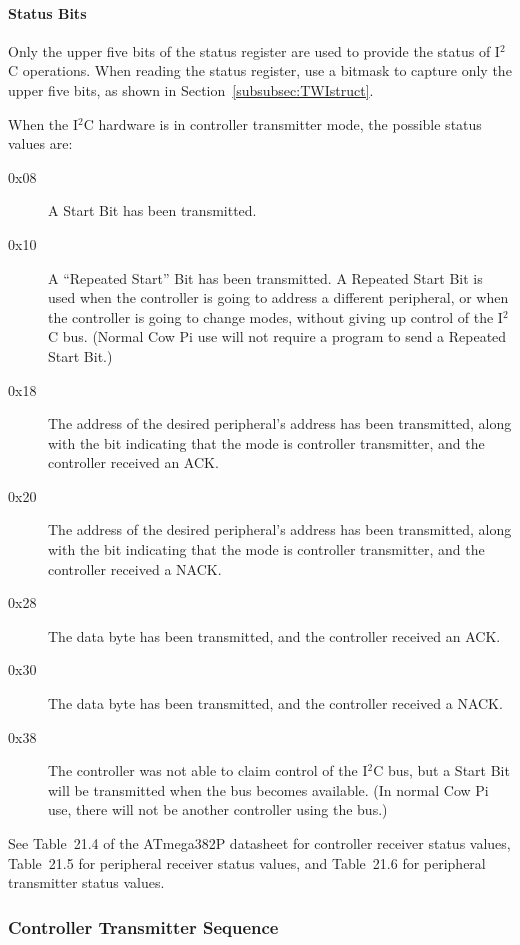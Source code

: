 \paragraph{Status Bits}

Only the upper five bits of the status register are used to provide the status of I$^2$C operations.
When reading the status register, use a bitmask to capture only the upper five bits, as shown in Section~\ref{subsubsec:TWIstruct}.

When the I$^2$C hardware is in controller transmitter mode, the possible status values are:

\begin{description}
    \item[0x08] A Start Bit has been transmitted.
    \item[0x10] A ``Repeated Start'' Bit has been transmitted.
        A Repeated Start Bit is used when the controller is going to address a different peripheral, or when the controller is going to change modes, without giving up control of the I$^2$C bus.
        (Normal Cow Pi use will not require a program to send a Repeated Start Bit.)
    \item[0x18] The address of the desired peripheral's address has been transmitted, along with the bit indicating that the mode is controller transmitter, and the controller received an ACK\@.
    \item[0x20] The address of the desired peripheral's address has been transmitted, along with the bit indicating that the mode is controller transmitter, and the controller received a NACK\@.
    \item[0x28] The data byte has been transmitted, and the controller received an ACK\@.
    \item[0x30] The data byte has been transmitted, and the controller received a NACK\@.
    \item[0x38] The controller was not able to claim control of the I$^2$C bus, but a Start Bit will be transmitted when the bus becomes available.
        (In normal Cow Pi use, there will not be another controller using the bus.)
\end{description}

See Table~21.4 of the ATmega382P datasheet\cite{ATmega328P} for controller receiver status values, Table~21.5 for peripheral receiver status values, and Table~21.6 for peripheral transmitter status values.

\subsubsection{Controller Transmitter Sequence} \label{subsubsec:controllerTransmitterSequence}

